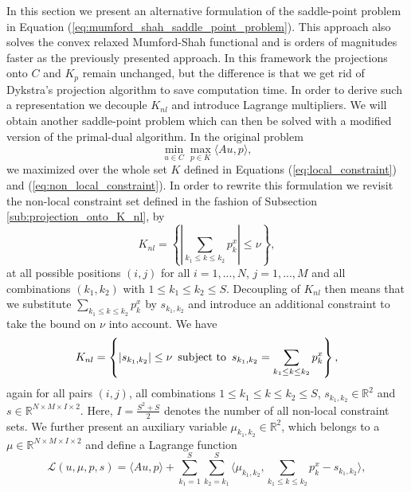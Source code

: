 \documentclass[abstracton]{scrreprt}
\begin{document}
        In this section we present an alternative formulation of the saddle-point problem in Equation (\ref{eq:mumford_shah_saddle_point_problem}). This approach also solves the convex relaxed Mumford-Shah functional and is orders of magnitudes faster as the previously presented approach. In this framework the projections onto $C$ and $K_{p}$ remain unchanged, but the difference is that we get rid of Dykstra's projection algorithm to save computation time. In order to derive such a representation we decouple $K_{nl}$ and introduce Lagrange multipliers. We will obtain another saddle-point problem which can then be solved with a modified version of the primal-dual algorithm. In the original problem
            \begin{equation}
                \min_{u \in C} \max_{p \in K} \langle Au, p \rangle,
                \label{eq:original_saddle_point_problem}
            \end{equation}
        we maximized over the whole set $K$ defined in Equations (\ref{eq:local_constraint}) and (\ref{eq:non_local_constraint}). In order to rewrite this formulation we revisit the non-local constraint set defined in the fashion of Subsection \ref{sub:projection_onto_K_nl}, by
            $$
                K_{nl} = \left\{ \left| \sum_{k_{1} \le k \le k_{2}} p^{x}_{k} \right| \le \nu \right\},
            $$
        at all possible positions $(i,j)$ for all $i = 1, ..., N$, $j = 1, ..., M$ and all combinations $(k_{1}, k_{2})$ with $1 \le k_{1} \le k_{2} \le S$. Decoupling of $K_{nl}$ then means that we substitute $\sum_{k_{1} \le k \le k_{2}} p^{x}_{k}$ by $s_{k_{1}, k_{2}}$ and introduce an additional constraint to take the bound on $\nu$ into account. We have
            \begin{equation}
                K_{nl} = \left\{ |s_{k_{1}, k_{2}}| \le \nu \,\,\, \textnormal{subject to} \,\,\, s_{k_{1}, k_{2}} = \sum_{k_{1} \le k \le k_{2}} p^{x}_{k} \right\},
                \label{eq:non_local_constraint_reloaded}
            \end{equation}
        again for all pairs $(i,j)$, all combinations $1 \le k_{1} \le k \le k_{2} \le S$, $s_{k_{1}, k_{2}} \in \mathbb{R}^{2}$ and $s \in \mathbb{R}^{N \times M \times I \times 2}$. Here, $I = \frac{S^{2} + S}{2}$ denotes the number of all non-local constraint sets. We further present an auxiliary variable $\mu_{k_{1}, k_{2}} \in \mathbb{R}^{2}$, which belongs to a $\mu \in \mathbb{R}^{N \times M \times I \times 2}$ and define a Lagrange function
            \begin{equation}
                \mathcal{L}(u, \mu, p, s) = \langle Au, p \rangle + \sum_{k_{1} = 1}^{S} \sum_{k_{2} = k_{1}}^{S} \langle \mu_{k_{1}, k_{2}}, \sum_{k_{1} \le k \le k_{2}} p^{x}_{k} - s_{k_{1}, k_{2}} \rangle,
                \label{eq:lagrangian}
            \end{equation}
\end{document}
